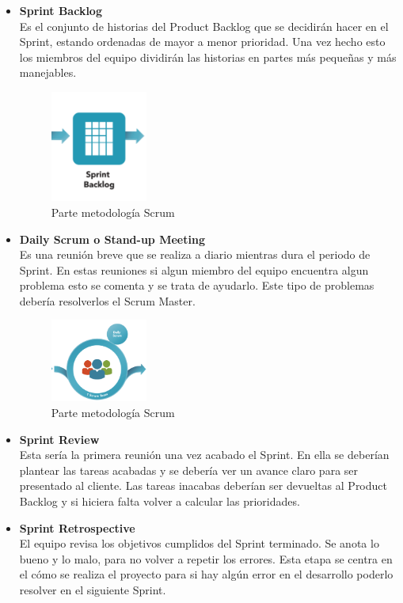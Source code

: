 \begin{itemize}
\item \textbf{Sprint Backlog}\\
Es el conjunto de historias del Product Backlog que se decidirán hacer en el Sprint, estando ordenadas de mayor a menor prioridad. Una vez hecho esto los miembros del equipo dividirán las historias en partes más pequeñas y más manejables.

\begin{figure}[H]
		\centering
		\includegraphics[width=0.3\textwidth] {sprint.png}
		\caption{Parte metodología Scrum }
	\end{figure} 

 
 
\item \textbf{Daily Scrum o Stand-up Meeting}\\
Es una reunión breve que se realiza a diario mientras dura el periodo de Sprint. 
En estas reuniones si algun miembro del equipo encuentra algun problema esto se comenta y se trata de ayudarlo. Este tipo de problemas debería resolverlos el Scrum Master.

\begin{figure}[H]
		\centering
		\includegraphics[width=0.3\textwidth] {daily.png}
		\caption{Parte metodología Scrum }
	\end{figure} 

\item\textbf{ Sprint Review}\\
Esta sería la primera reunión una vez acabado el Sprint. En ella se deberían plantear las tareas acabadas y se debería ver un avance claro para ser presentado al cliente. Las tareas inacabas deberían ser devueltas al Product Backlog y si hiciera falta volver a calcular las prioridades.

 \item \textbf{Sprint Retrospective}\\
  El equipo revisa los objetivos cumplidos del Sprint terminado. Se anota lo bueno y lo malo, para no volver a repetir los errores. Esta etapa se centra en el cómo se realiza el proyecto para si hay algún error en el desarrollo poderlo resolver en el siguiente Sprint.
\end{itemize}



